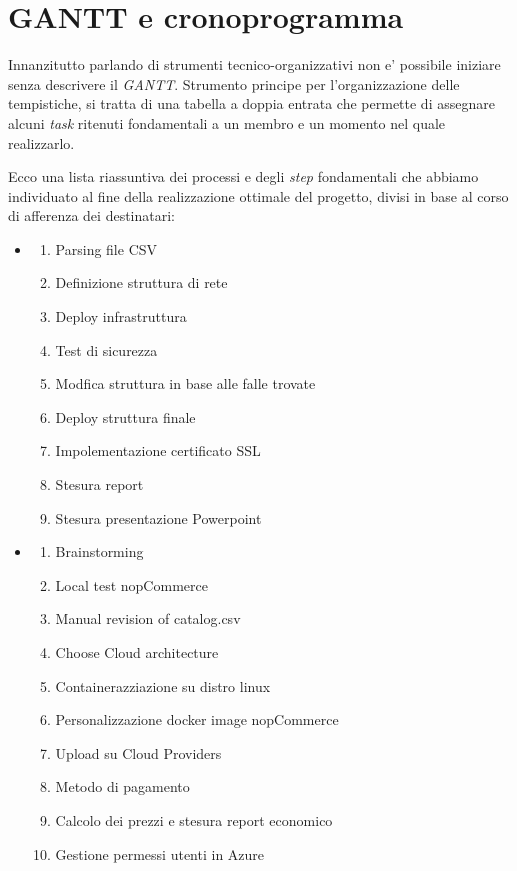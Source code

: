 \documentclass[a4paper]{report}
\begin{document}
	\section{GANTT e cronoprogramma}\label{gantt_e_cronoprogramma}
		Innanzitutto parlando di strumenti tecnico-organizzativi non e' possibile iniziare senza descrivere il
		\emph{GANTT}.  Strumento principe per l'organizzazione delle tempistiche, si tratta di una tabella a doppia
		entrata che permette di assegnare alcuni \emph{task} ritenuti fondamentali a un membro e un momento nel quale
		realizzarlo.

		Ecco una lista riassuntiva dei processi e degli \emph{step} fondamentali che abbiamo individuato al fine della
		realizzazione ottimale del progetto, divisi in base al corso di afferenza dei destinatari:
		\begin{itemize}
			\item \begin{enumerate}
					\item Parsing file CSV
					\item Definizione struttura di rete
					\item Deploy infrastruttura
					\item Test di sicurezza
					\item Modfica struttura in base alle falle trovate
					\item Deploy struttura finale
					\item Impolementazione certificato SSL
					\item Stesura report
					\item Stesura presentazione Powerpoint
				\end{enumerate}
			\item \begin{enumerate}
					\item Brainstorming
					\item Local test nopCommerce
					\item Manual revision of catalog.csv
					\item Choose Cloud architecture
					\item Containerazziazione su distro linux
					\item Personalizzazione docker image nopCommerce
					\item Upload su Cloud Providers
					\item Metodo di pagamento
					\item Calcolo dei prezzi e stesura report economico
					\item Gestione permessi utenti in Azure
				\end{enumerate}
		\end{itemize}
\end{document}
